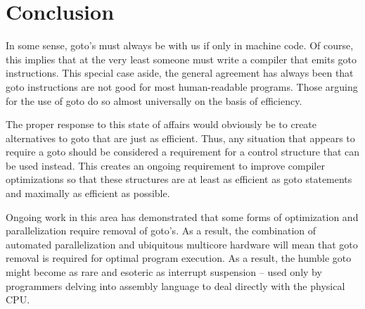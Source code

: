 \documentclass[letterpaper,12pt]{article}
\begin{document}
\section{Conclusion}

In some sense, goto's must always be with us if only in machine code.  Of
course, this implies that at the very least someone must write a compiler
that emits goto instructions.  This special case aside, the general agreement
has always been that goto instructions are not good for most human-readable
programs.  Those arguing for the use of goto do so almost universally on
the basis of efficiency.

The proper response to this state of affairs would obviously be to create
alternatives to goto that are just as efficient.  Thus, any situation that
appears to require a goto should be considered a requirement for a control
structure that can be used instead.  This creates an ongoing requirement
to improve compiler optimizations so that these structures are at least as
efficient as goto statements and maximally as efficient as possible.

Ongoing work in this area has demonstrated that some forms of optimization
and parallelization require removal of goto's.  As a result, the combination
of automated parallelization and ubiquitous multicore hardware will mean
that goto removal is required for optimal program execution.   As a result,
the humble goto might become as rare and esoteric as interrupt suspension --
used only by programmers delving into assembly language to deal directly with the
physical CPU.



\nocite{*} %


\end{document}
